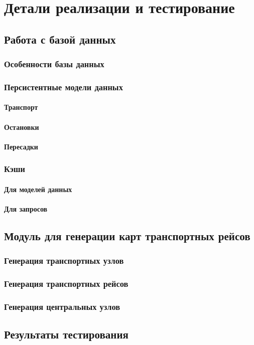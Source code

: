 \chapter{Детали реализации и тестирование}

\section{Работа с базой данных}
\subsection{Особенности базы данных}
\subsection{Персистентные модели данных}
\subsubsection{Транспорт}
\subsubsection{Остановки}
\subsubsection{Пересадки}
\subsection{Кэши}
\subsubsection{Для моделей данных}
\subsubsection{Для запросов}
\section{Модуль для генерации карт транспортных рейсов}
\subsection{Генерация транспортных узлов}
\subsection{Генерация транспортных рейсов}
\subsection{Генерация центральных узлов}
\section{Результаты тестирования}
\chapterconclusion